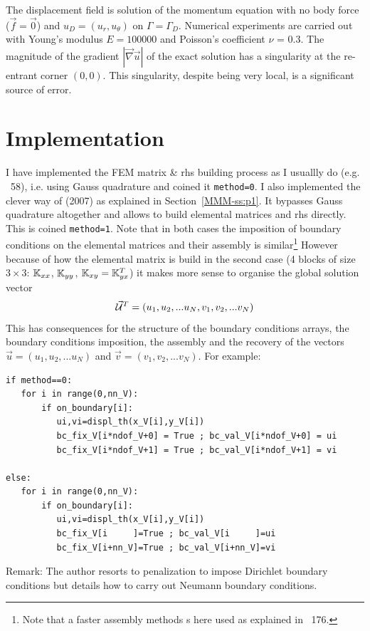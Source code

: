 The displacement field is solution of the momentum equation 
with no body force ($\vec{f} = \vec{0}$) and $u_D = (u_r , u_\theta )$ on 
$\Gamma = \Gamma_D$. Numerical
experiments are carried out with Young's modulus $E = 100000$ 
and Poisson’s coefficient $\nu$ = 0.3. The magnitude of
the gradient $|\vec\nabla \vec{u}|$ of the exact solution 
has a singularity at the re-entrant corner $(0,0)$. This singularity,
despite being very local, is a significant source of error.

\section*{Implementation}

I have implemented the FEM matrix \& rhs building process as I 
usuallly do (e.g. \stone~58), i.e. using Gauss quadrature and
coined it \lstinline{method=0}.
I also implemented the clever way of \textcite{koko07} (2007)
as explained in Section~\ref{MMM-ss:p1}. It bypasses Gauss quadrature
altogether and allows to build elemental matrices and rhs directly.
This is coined \lstinline{method=1}.
Note that in both cases the imposition of boundary conditions on the 
elemental matrices and their assembly is similar\footnote{Note 
that a faster assembly methods s here used as explained in \stone~176.} 
However because of how the elemental matrix is build in the second case
(4 blocks of size $3\times 3$: ${\mathbb{K}}_{xx}$, ${\mathbb{K}}_{yy}$, ${\mathbb{K}}_{xy}={\mathbb{K}}_{yx}^T$)
it makes more sense to organise the global solution vector 
\[
\vec{\cal U}^T=(u_1,u_2, ...u_N,v_1,v_2,... v_N)
\]
This has consequences for the structure of the boundary conditions arrays, 
the boundary conditions imposition, the assembly and the recovery of 
the vectors $\vec{u}=(u_1,u_2,...u_N)$ and $\vec{v}=(v_1,v_2,...v_N)$. 
For example:
\begin{lstlisting}
if method==0:
   for i in range(0,nn_V):
       if on_boundary[i]: 
          ui,vi=displ_th(x_V[i],y_V[i])
          bc_fix_V[i*ndof_V+0] = True ; bc_val_V[i*ndof_V+0] = ui
          bc_fix_V[i*ndof_V+1] = True ; bc_val_V[i*ndof_V+1] = vi

else:
   for i in range(0,nn_V):
       if on_boundary[i]: 
          ui,vi=displ_th(x_V[i],y_V[i])
          bc_fix_V[i     ]=True ; bc_val_V[i     ]=ui
          bc_fix_V[i+nn_V]=True ; bc_val_V[i+nn_V]=vi
\end{lstlisting}

Remark: The author resorts to penalization to impose Dirichlet 
boundary conditions but details how to carry out Neumann boundary conditions.

